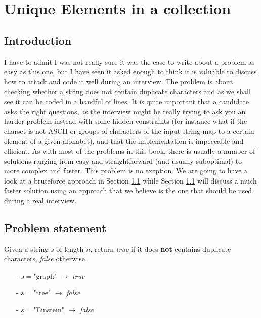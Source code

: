 %


\chapter{Unique Elements in a collection}
\label{ch:unique_elements}
\section*{Introduction}
I have to admit I was not really sure it was the case to write about a problem as easy as this one,
but I have seen it asked enough to think it is valuable to discuss how to attack and
code it well during an interview. 
The problem is about checking whether a string does not contain
duplicate characters and as we shall see it can be coded in a handful of lines. 
It is quite important that a candidate asks the right questions, 
as the interview might be really trying to ask
you an harder problem instead with some hidden constraints (for instance what if the charset is not
ASCII or groups of characters of the input string map to a certain element of a given alphabet),
and that the implementation is impeccable and efficient. 
As with most of the problems in
this book, there is usually a number of solutions ranging from easy and straightforward (and usually
suboptimal) to more complex and faster. This problem is no exeption.  We are going to have a look at 
a bruteforce approach in Section \ref{} while Section \ref{} will discuss a much faster solution using an approach 
that we believe is the one that should be used during a real interview.


\section{Problem statement}
Given a string $s$ of length $n$, return \textit{true} if it does \textbf{not} contains duplicate characters, \textit{false} otherwise. 

\begin{example}
\hfill
	\begin{itemize}
		\item [-] $s=$"graph" $ \longrightarrow$ \textit{true}
		\item [-] $s=$"tree" $ \longrightarrow$ \textit{false}
		\item [-] $s=$"Einstein" $ \longrightarrow$ \textit{false}
	\end{itemize}
	
\end{example}

